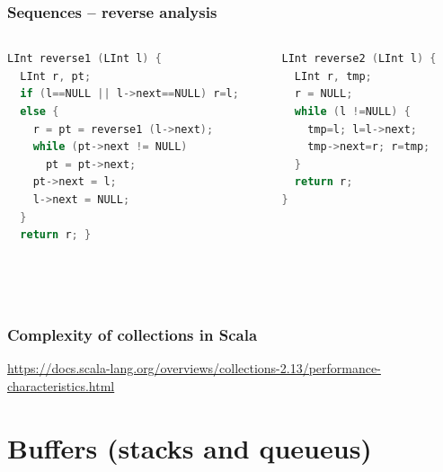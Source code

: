 \documentclass[aspectratio=169]{beamer}
\begin{document}
\begin{frame}[fragile]\frametitle{Sequences -- reverse analysis}
  
\begin{columns}
\begin{column}{.48\textwidth}
\begin{lstlisting}[language=C++, emph={reverse1,reverse2,LInt}]
LInt reverse1 (LInt l) {
  LInt r, pt;
  if (l==NULL || l->next==NULL) r=l;
  else {
    r = pt = reverse1 (l->next);
    while (pt->next != NULL)
      pt = pt->next;
    pt->next = l;
    l->next = NULL;
  }
  return r; }
\end{lstlisting}
%
\end{column}
\begin{column}{.50\textwidth}
%
\begin{lstlisting}[language=C++, emph={reverse1,reverse2,LInt}]
LInt reverse2 (LInt l) {
  LInt r, tmp;
  r = NULL;
  while (l !=NULL) {
    tmp=l; l=l->next;
    tmp->next=r; r=tmp;
  }
  return r;
}
\end{lstlisting}
%
\end{column}
\end{columns}

~\\[-6mm]
~\\[-12mm]
\end{frame}


\begin{frame}\frametitle{Complexity of collections in Scala}
    
    \centering

    \begin{block}{}
    {\huge \url{https://docs.scala-lang.org/overviews/collections-2.13/performance-characteristics.html}}      
    \end{block}


\end{frame}


\section{Buffers (stacks and queueus)}
\end{document}

